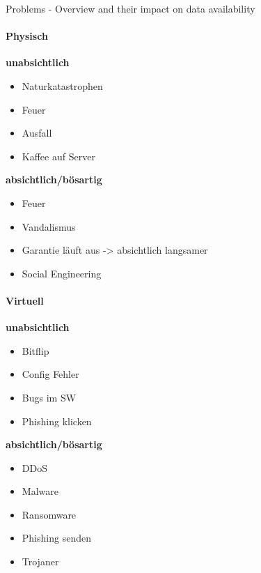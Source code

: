 \begin{concept}{Problems - Overview} and their impact on data availability
\paragraph{Physisch}
\textbf{unabsichtlich}
\begin{itemize}
    \item Naturkatastrophen
    \item Feuer
    \item Ausfall
    \item Kaffee auf Server
\end{itemize}

\textbf{absichtlich/bösartig}
\begin{itemize}
    \item Feuer
    \item Vandalismus
    \item Garantie läuft aus -> absichtlich langsamer
    \item Social Engineering
\end{itemize}

\paragraph{Virtuell}
\textbf{unabsichtlich}
\begin{itemize}
    \item Bitflip
    \item Config Fehler
    \item Bugs im SW
    \item Phishing klicken
\end{itemize}

\textbf{absichtlich/bösartig}
\begin{itemize}
    \item DDoS
    \item Malware
    \item Ransomware
    \item Phishing senden
    \item Trojaner
\end{itemize}
\end{concept}

